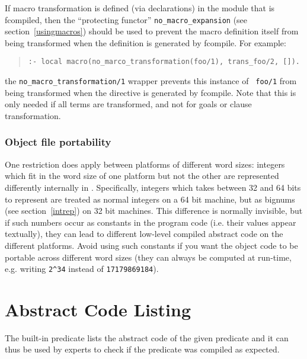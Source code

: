 If macro transformation is defined (via 
declarations) in the module that is fcompiled, then
the ``protecting functor'' {\tt no_macro_expansion}
  (see
section~\ref{usingmacros}) should be used to prevent the macro definition
itself from being transformed when the definition is generated by
fcompile. For example:

\begin{quote}\begin{verbatim}
:- local macro(no_marco_transformation(foo/1), trans_foo/2, []).
\end{verbatim}\end{quote}

\noindent
the {\tt no_macro_transformation/1} wrapper prevents this instance of {\tt
foo/1} from being transformed when the directive is generated by fcompile.
Note that this is only needed if all terms are transformed, and not for
goals or clause transformation.

\subsubsection{Object file portability}
\label{objectport}

One restriction does apply between platforms of different
word sizes: integers which fit in the word size of one platform
but not the other are represented differently internally in {\eclipse}. 
Specifically, integers which takes between 32 and 64
bits to represent are treated as normal integers on a 64 bit machine,
but as bignums (see section~\ref{intrep}) on 32 bit machines. This
difference is normally invisible, but if
such numbers occur as constants in the program code (i.e. their values appear
textually), they can lead to different low-level compiled abstract code on
the different platforms. Avoid using such constants if you want
the object code to be portable across different word sizes (they can always
be computed at run-time, e.g. writing \verb'2^34' instead of {\tt 17179869184}).



\section{Abstract Code Listing}
The built-in predicate  lists the abstract code
of the given predicate and it can thus be used by experts
to check if the predicate was compiled as expected.







